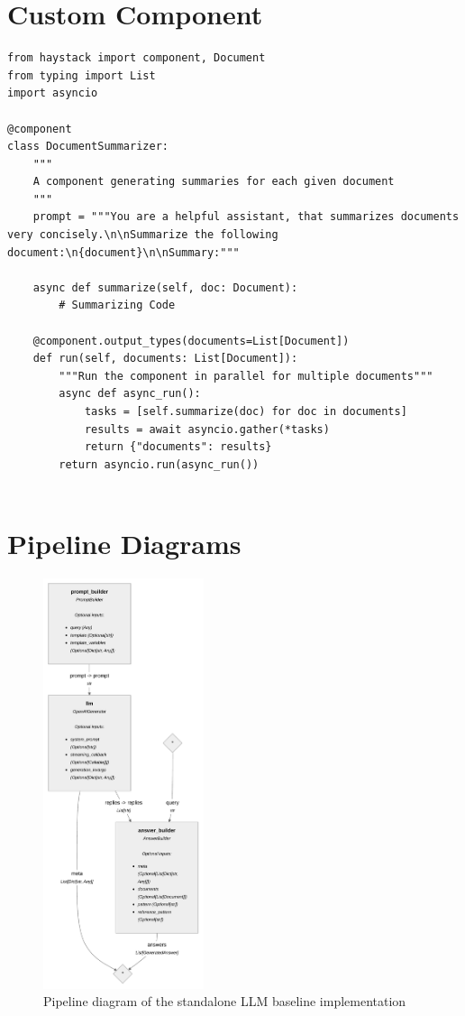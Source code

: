 \section*{Custom Component}

\begin{verbatim}
from haystack import component, Document
from typing import List
import asyncio

@component
class DocumentSummarizer:
    """
    A component generating summaries for each given document
    """
    prompt = """You are a helpful assistant, that summarizes documents very concisely.\n\nSummarize the following document:\n{document}\n\nSummary:"""

    async def summarize(self, doc: Document):
        # Summarizing Code

    @component.output_types(documents=List[Document])
    def run(self, documents: List[Document]):
        """Run the component in parallel for multiple documents"""
        async def async_run():
            tasks = [self.summarize(doc) for doc in documents]
            results = await asyncio.gather(*tasks)
            return {"documents": results}
        return asyncio.run(async_run())


\end{verbatim}


\newpage

\section*{Pipeline Diagrams}

\begin{figure}[h]
  \centering
  \includegraphics[width=0.42\textwidth]{images/baseline_llm.pdf}
  \caption{Pipeline diagram of the standalone LLM baseline implementation}
  \label{fig:pipeline_llm}
\end{figure}

